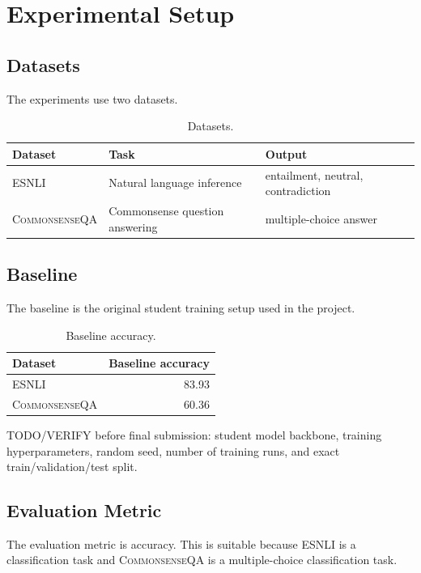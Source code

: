 \documentclass[11pt]{article}
\newcommand{\dataset}[1]{\textsc{#1}}
\begin{document}
\section{Experimental Setup}

\subsection{Datasets}

The experiments use two datasets.

\begin{table}[H]
\centering
\caption{Datasets.}
\begin{tabularx}{\linewidth}{lXX}
\toprule
Dataset & Task & Output \\
\midrule
\dataset{ESNLI} & Natural language inference & entailment, neutral, contradiction \\
\dataset{CommonsenseQA} & Commonsense question answering & multiple-choice answer \\
\bottomrule
\end{tabularx}
\end{table}

\subsection{Baseline}

The baseline is the original student training setup used in the project.

\begin{table}[H]
\centering
\caption{Baseline accuracy.}
\begin{tabular}{lr}
\toprule
Dataset & Baseline accuracy \\
\midrule
\dataset{ESNLI} & 83.93 \\
\dataset{CommonsenseQA} & 60.36 \\
\bottomrule
\end{tabular}
\end{table}

TODO/VERIFY before final submission: student model backbone, training hyperparameters, random seed, number of training runs, and exact train/validation/test split.

\subsection{Evaluation Metric}

The evaluation metric is accuracy. This is suitable because \dataset{ESNLI} is a classification task and \dataset{CommonsenseQA} is a multiple-choice classification task.
\end{document}
